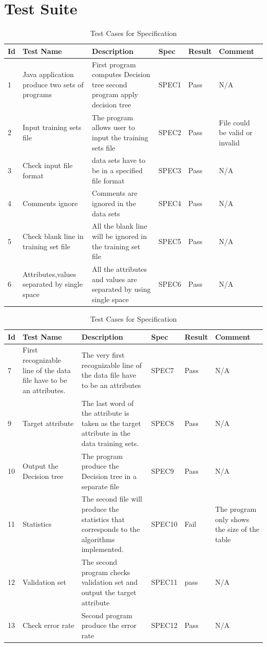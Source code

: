 \documentclass{article}
\begin{document}
\section{Test Suite}
\label{sec:test}
\begin{table}[ht]
\caption{Test Cases for Specification} 
\centering
\begin{tabularx}{\textwidth}{|l|X|X|l|l|X|} 
\hline \hline 
Id & Test Name & Description & Spec & Result & Comment \\ 
\hline \hline 
1 & Java application produce two sets of programs & First program computes Decision tree second program apply decision tree & SPEC1 & Pass & N/A \\\hline 
2 & Input training sets file & The program allows user to input the training sets file & SPEC2 & Pass & File could be valid or invalid \\\hline
3 & Check input file format & data sets have to be in a specified file format & SPEC3 & Pass & N/A\\\hline
4 & Comments ignore & Comments are ignored in the data sets & SPEC4 & Pass & N/A \\\hline
5 & Check blank line in training set file & All the blank line will be ignored in the training set file & SPEC5 & Pass & N/A \\\hline
6 & Attributes,values separated by single space & All the attributes and values are separated by using single space & SPEC6 & Pass & N/A \\\hline 

\end{tabularx}
\end{table}
\pagebreak

\begin{table}[ht]
\caption{Test Cases for Specification} 
\centering
\begin{tabularx}{\textwidth}{|l|X|X|l|l|X|} 
\hline \hline 
Id & Test Name & Description & Spec & Result & Comment \\ 
\hline \hline 

7 & First recognizable line of the data file have to be an attributes. & The very first recognizable line of the data file have to be an attributes & SPEC7 & Pass & N/A \\\hline 
9 & Target attribute & The last word of the attribute is taken as the target attribute in the data training sets. & SPEC8 & Pass & N/A \\\hline 
10 & Output the Decision tree & The program produce the Decision tree in a separate file  & SPEC9 & Pass & N/A \\\hline 
11 & Statistics & The second file will produce the statistics that corresponds to the algorithms implemented. & SPEC10 & Fail & The program only shows the size of the table \\\hline
12 & Validation set & The second program checks validation set and output the target attribute & SPEC11 & pass & N/A \\\hline
13 & Check error rate & Second program produce the error rate & SPEC12 & Pass & N/A \\\hline


\end{tabularx}
\end{table}
\pagebreak




\end{document}
